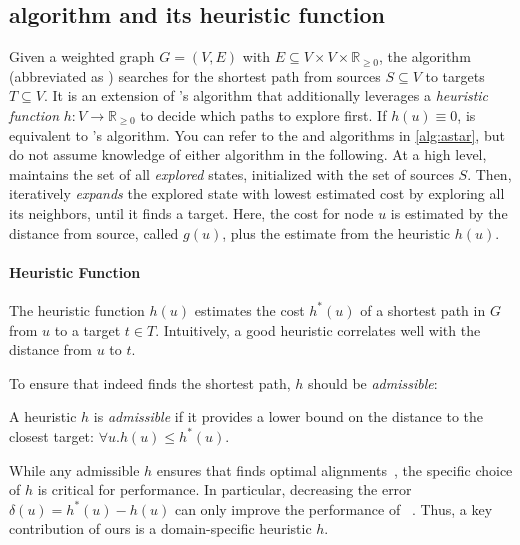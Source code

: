 \subsection{\A algorithm and its heuristic function} \label{sec:astar}

Given a weighted graph $G=(V,E)$ with $E \subseteq V \times V \times
\mathbb{R}_{\geq 0}$, the \A algorithm (abbreviated as \A) searches for the
shortest path from sources $S \subseteq V$ to targets $T \subseteq V$. It is an
extension of \dijkstra's algorithm that additionally leverages a \emph{heuristic
function} $h \colon V \to \mathbb{R}_{\geq 0}$ to decide which paths to explore
first.
%
If $h(u) \equiv 0$, \A is equivalent to \dijkstra's algorithm.
%
You can refer to the \A and \dijkstra algorithms in \cref{alg:astar}, but do not
assume knowledge of either algorithm in the following.
%
At a high level, \A maintains the set of all \emph{explored} states, initialized
with the set of sources $S$. Then, \A iteratively \emph{expands} the explored
state with lowest estimated cost by exploring all its neighbors, until it finds
a target. Here, the cost for node $u$ is estimated by the distance from source, called $g(u)$, plus the estimate from the heuristic $h(u)$.

\paragraph{Heuristic Function}
The heuristic function $h(u)$ estimates the
cost $h^*(u)$ of a shortest path in $G$ from $u$ to a target $t \in T$. Intuitively, a
good heuristic correlates well with the distance from $u$ to $t$.

To ensure that \A indeed finds the shortest path, $h$ should be
\emph{admissible}:

\begin{definition} A heuristic $h$ is \emph{admissible}
    if it provides a lower bound on the distance to the closest target: $\forall
    u. h(u) \leq h^*(u)$.
\end{definition}

While any admissible $h$ ensures that \A finds optimal
alignments~\cite{dechter_generalized_1985}, the specific choice of $h$
is critical for performance. In particular, decreasing the error $\delta(u) =
h^*(u)-h(u)$ can only improve the performance of
\A~\cite{dechter_generalized_1985}. Thus, a key contribution of ours is
a domain-specific heuristic $h$.


